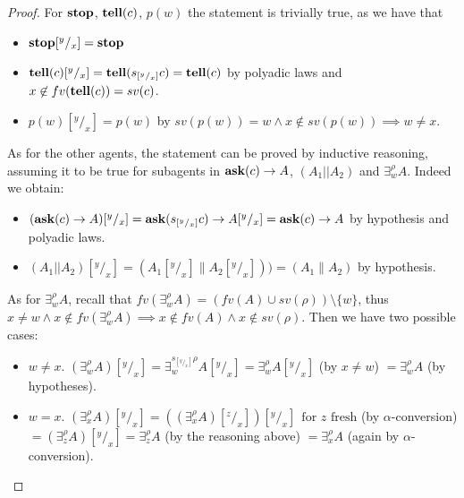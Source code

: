 \documentclass{llncs}
\newcommand{\tell}{{\bf tell}}
\newcommand{\ask}{{\bf ask}}
\newcommand{\ostop}{{\bf stop}}
\begin{document}
\begin{proof}
For $\ostop$, $\tell(c)$, $p(w)$ the statement is trivially true, as we have that
\begin{itemize}
	\item $\ostop[^y/_x] = \ostop$
	\item $\tell(c)[^y/_x] = \tell(s_{[^y/_x]}c) = \tell(c)$ by polyadic laws and $x \not
	\in fv(\tell(c)) = sv(c)$.
	\item $p(w)[^y/_x] = p(w)$ by $sv(p(w)) = {w} \wedge x \not \in sv(p(w)) \implies
	w \not = x$.
\end{itemize}
As for the other agents, the statement can be proved by inductive reasoning, assuming it to be true for subagents in $\ask(c) \rightarrow A$, $(A_1 || A_2)$ and $\exists^{\rho}_w A$. Indeed we obtain:
\begin{itemize}
	\item $(\ask(c) \rightarrow A)[^y/_x] =  
	\ask(s_{[^y/_x]}c) \rightarrow A[^y/_x] = \ask(c) \rightarrow A$
	by hypothesis and polyadic laws.
	\item $(A_1 || A_2)[^y/_x] = (A_1[^y/_x] \parallel A_2[^y/_x])) = (A_1 \parallel A_2)$
	by hypothesis.
\end{itemize}
As for $\exists^{\rho}_w A$, recall that $fv(\exists^{\rho}_w A) = (fv(A) \cup sv(\rho)) \setminus \{w\}$, thus $x \not = w \wedge x \not \in fv(\exists^{\rho}_w A) \implies x \not \in fv(A) \wedge x \not \in sv(\rho)$. Then we have two possible cases:
\begin{itemize}
	\item $w \not = x$. $(\exists^{\rho}_w A)[^y/_x] = \exists^{s_{[^y/_x]}\rho}_w A[^y/_x] = 
	\exists^{\rho}_w A[^y/_x]$ (by $x \not = w$) $= \exists^{\rho}_w A$ (by hypotheses).
	\item $w = x$. $(\exists^{\rho}_x A)[^y/_x] = ((\exists^{\rho}_x A)[^z/_x])[^y/_x] \ \ 
	\text{for $z$ fresh}$ (by $\alpha$-conversion) $= (\exists^{\rho}_z A)[^y/_x] = \exists^{\rho}_z A$
	(by the reasoning above) $= \exists^{\rho}_x A$ (again by $\alpha$-conversion).   
\end{itemize}
\end{proof}
\end{document}

